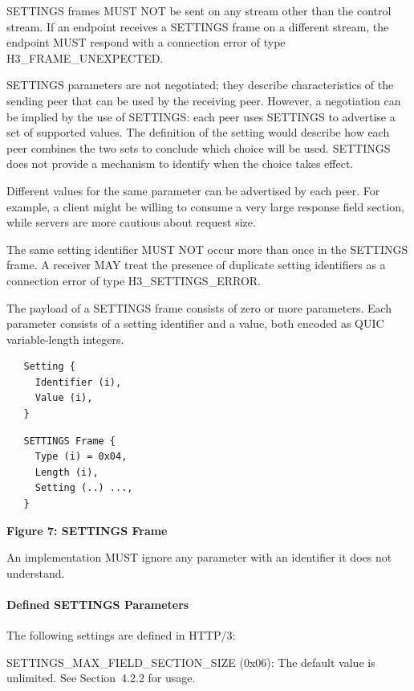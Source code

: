 \documentclass{article}
\begin{document}
SETTINGS frames MUST NOT be sent on any stream other than the control stream.  If an endpoint receives a SETTINGS frame on a different stream, the endpoint MUST respond with a connection error of type H3\_FRAME\_UNEXPECTED.

SETTINGS parameters are not negotiated; they describe characteristics of the sending peer that can be used by the receiving peer.  However, a negotiation can be implied by the use of SETTINGS: each peer uses SETTINGS to advertise a set of supported values.  The definition of the setting would describe how each peer combines the two sets to conclude which choice will be used.  SETTINGS does not provide a mechanism to identify when the choice takes effect.

Different values for the same parameter can be advertised by each peer.  For example, a client might be willing to consume a very large response field section, while servers are more cautious about request size.

The same setting identifier MUST NOT occur more than once in the SETTINGS frame.  A receiver MAY treat the presence of duplicate setting identifiers as a connection error of type H3\_SETTINGS\_ERROR.

The payload of a SETTINGS frame consists of zero or more parameters. Each parameter consists of a setting identifier and a value, both encoded as QUIC variable-length integers.

\begin{verbatim}
   Setting {
     Identifier (i),
     Value (i),
   }
\end{verbatim}

\begin{verbatim}
   SETTINGS Frame {
     Type (i) = 0x04,
     Length (i),
     Setting (..) ...,
   }
\end{verbatim}

\begin{center}
\textbf{Figure 7: SETTINGS Frame}
\end{center}

An implementation MUST ignore any parameter with an identifier it does not understand.

\paragraph{Defined SETTINGS Parameters}

The following settings are defined in HTTP/3:

SETTINGS\_MAX\_FIELD\_SECTION\_SIZE (0x06):  The default value is unlimited.  See Section~4.2.2 for usage.
\end{document}
